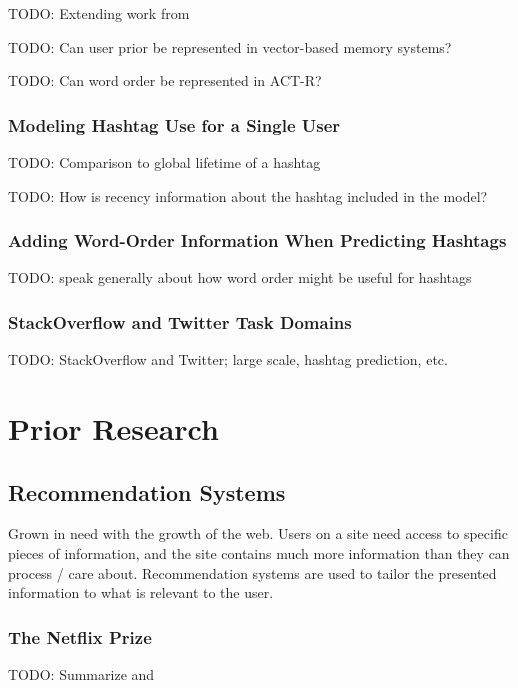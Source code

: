 \documentclass[man]{apa6}
\begin{document}
TODO: Extending work from \cite{Rutledge2008}

TODO: Can user prior be represented in vector-based memory systems?

TODO: Can word order be represented in ACT-R?

\subsubsection{Modeling Hashtag Use for a Single User}

TODO: Comparison to global lifetime of a hashtag \cite{Tsur2012}

TODO: How is recency information about the hashtag included in the model?

\subsubsection{Adding Word-Order Information When Predicting Hashtags}

TODO: speak generally about how word order might be useful for hashtags

\subsubsection{StackOverflow and Twitter Task Domains}

TODO: StackOverflow and Twitter; large scale, hashtag prediction, etc. 

\section{Prior Research}

\subsection{Recommendation Systems}

Grown in need with the growth of the web.
Users on a site need access to specific pieces of information, and the site contains much more information than they can process / care about.
Recommendation systems are used to tailor the presented information to what is relevant to the user.
\cite{Pazzani2007}

\subsubsection{The Netflix Prize}

TODO: Summarize and \cite{Bennett2007}
\end{document}
